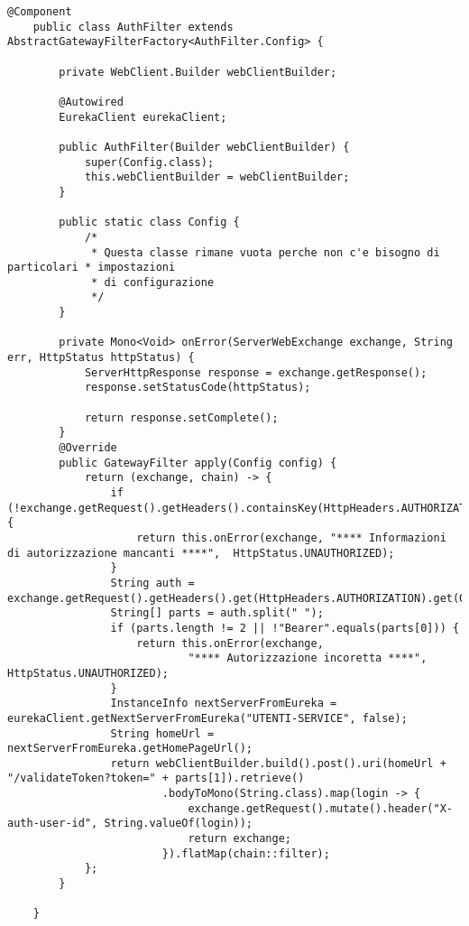 \begin{lstlisting}[style = Java, caption = {Implementazione della classe \texttt{AuthFilter}}]
    @Component
    public class AuthFilter extends AbstractGatewayFilterFactory<AuthFilter.Config> {
    
        private WebClient.Builder webClientBuilder;
    
        @Autowired
        EurekaClient eurekaClient;
    
        public AuthFilter(Builder webClientBuilder) {
            super(Config.class);
            this.webClientBuilder = webClientBuilder;
        }
    
        public static class Config {
            /*
             * Questa classe rimane vuota perche non c'e bisogno di particolari * impostazioni
             * di configurazione
             */
        }
    
        private Mono<Void> onError(ServerWebExchange exchange, String err, HttpStatus httpStatus) {
            ServerHttpResponse response = exchange.getResponse();
            response.setStatusCode(httpStatus);
    
            return response.setComplete();
        }
        @Override
        public GatewayFilter apply(Config config) {
            return (exchange, chain) -> {
                if (!exchange.getRequest().getHeaders().containsKey(HttpHeaders.AUTHORIZATION)) {
                    return this.onError(exchange, "**** Informazioni di autorizzazione mancanti ****",  HttpStatus.UNAUTHORIZED);
                }
                String auth = exchange.getRequest().getHeaders().get(HttpHeaders.AUTHORIZATION).get(0);
                String[] parts = auth.split(" ");
                if (parts.length != 2 || !"Bearer".equals(parts[0])) {
                    return this.onError(exchange, 
                            "**** Autorizzazione incoretta ****", HttpStatus.UNAUTHORIZED);
                }
                InstanceInfo nextServerFromEureka = eurekaClient.getNextServerFromEureka("UTENTI-SERVICE", false);
                String homeUrl = nextServerFromEureka.getHomePageUrl();
                return webClientBuilder.build().post().uri(homeUrl + "/validateToken?token=" + parts[1]).retrieve()
                        .bodyToMono(String.class).map(login -> {
                            exchange.getRequest().mutate().header("X-auth-user-id", String.valueOf(login));
                            return exchange;
                        }).flatMap(chain::filter);
            };
        }
    
    }
\end{lstlisting}
